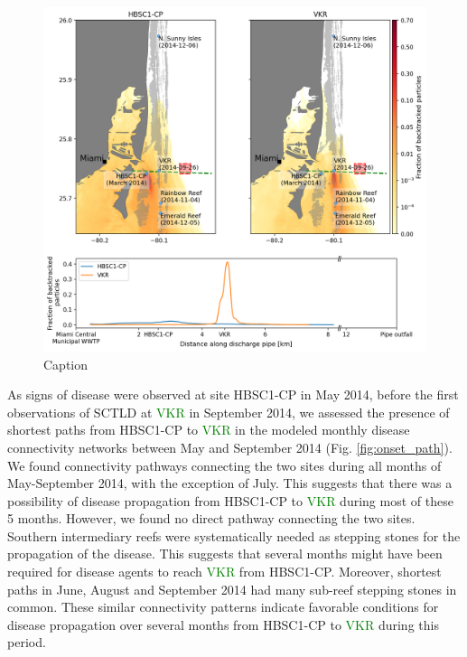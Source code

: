 \documentclass[preprint,12pt,authoryear]{elsarticle}
\newcommand{\modif}[1]{\textcolor{green}{#1}}
\begin{document}

\begin{figure}
    \centering
    \includegraphics[width=.98\textwidth]{figures/fig_proba_stokes.png}
    \caption{Caption}
    \label{fig:backtrack}
\end{figure}

As signs of disease were observed at site HBSC1-CP in May 2014, before the first observations of SCTLD at \modif{VKR} in September 2014, we assessed the presence of shortest paths from HBSC1-CP to \modif{VKR} in the modeled monthly disease connectivity networks between May and September 2014 (Fig. \ref{fig:onset_path}). We found connectivity pathways connecting the two sites during all months of May-September 2014, with the exception of July. This suggests that there was a possibility of disease propagation from HBSC1-CP to \modif{VKR} during most of these 5 months. However, we found no direct pathway connecting the two sites. Southern intermediary reefs were systematically needed as stepping stones for the propagation of the disease. This suggests that several months might have been required for disease agents to reach \modif{VKR} from HBSC1-CP. Moreover, shortest paths in June, August and September 2014 had many sub-reef stepping stones in common. These similar connectivity patterns indicate favorable conditions for disease propagation over several months from HBSC1-CP to \modif{VKR} during this period. 
\end{document}
